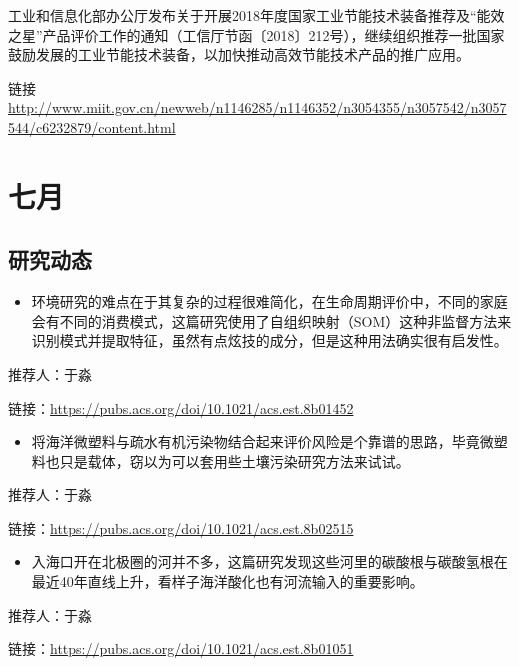 \documentclass[]{book}
\providecommand{\tightlist}{%
  \setlength{\itemsep}{0pt}\setlength{\parskip}{0pt}}
\begin{document}
工业和信息化部办公厅发布关于开展2018年度国家工业节能技术装备推荐及``能效之星''产品评价工作的通知（工信厅节函〔2018〕212号），继续组织推荐一批国家鼓励发展的工业节能技术装备，以加快推动高效节能技术产品的推广应用。

链接 \url{http://www.miit.gov.cn/newweb/n1146285/n1146352/n3054355/n3057542/n3057544/c6232879/content.html}

\hypertarget{ux4e03ux6708}{%
\section*{七月}\label{ux4e03ux6708}}

\hypertarget{ux7814ux7a76ux52a8ux6001-8}{%
\subsection*{研究动态}\label{ux7814ux7a76ux52a8ux6001-8}}

\begin{itemize}
\tightlist
\item
  环境研究的难点在于其复杂的过程很难简化，在生命周期评价中，不同的家庭会有不同的消费模式，这篇研究使用了自组织映射（SOM）这种非监督方法来识别模式并提取特征，虽然有点炫技的成分，但是这种用法确实很有启发性。
\end{itemize}

推荐人：于淼

链接：\url{https://pubs.acs.org/doi/10.1021/acs.est.8b01452}

\begin{itemize}
\tightlist
\item
  将海洋微塑料与疏水有机污染物结合起来评价风险是个靠谱的思路，毕竟微塑料也只是载体，窃以为可以套用些土壤污染研究方法来试试。
\end{itemize}

推荐人：于淼

链接：\url{https://pubs.acs.org/doi/10.1021/acs.est.8b02515}

\begin{itemize}
\tightlist
\item
  入海口开在北极圈的河并不多，这篇研究发现这些河里的碳酸根与碳酸氢根在最近40年直线上升，看样子海洋酸化也有河流输入的重要影响。
\end{itemize}

推荐人：于淼

链接：\url{https://pubs.acs.org/doi/10.1021/acs.est.8b01051}
\end{document}
